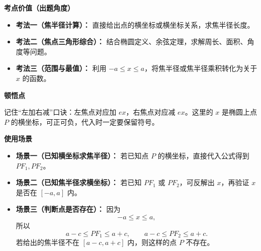 \begin{explanationbox}
	\medskip
	\textbf{\textcolor{CExplanation}{考点价值（出题角度）}}
	\begin{itemize}[leftmargin=*, itemsep=0.5em, topsep=0.4em]
		\item \textbf{考法一（焦半径计算）：} 直接给出点的横坐标或横坐标关系，求焦半径长度。
		\item \textbf{考法二（焦点三角形综合）：} 结合椭圆定义、余弦定理，求解周长、面积、角度等问题。
		\item \textbf{考法三（范围与最值）：} 利用 $-a\le x\le a$，将焦半径或焦半径乘积转化为关于 $x$ 的函数。
	\end{itemize}

	\medskip
	\textbf{\textcolor{CExplanation}{顿悟点}}

	记住“左加右减”口诀：左焦点对应加 $ex$，右焦点对应减 $ex$。这里的 $x$ 是椭圆上点 $P$ 的横坐标，可正可负，代入时一定要保留符号。

	\medskip
	\textbf{\textcolor{CExplanation}{使用场景}}
	\begin{itemize}[leftmargin=*, itemsep=0.5em, topsep=0.4em]
		\item \textbf{场景一（已知横坐标求焦半径）：} 若已知点 $P$ 的横坐标，直接代入公式得到 $PF_1,PF_2$。
		\item \textbf{场景二（已知焦半径求横坐标）：} 若已知 $PF_1$ 或 $PF_2$，可反解出 $x$，再验证 $x$ 是否在 $[-a,a]$ 内。
		\item \textbf{场景三（判断点是否存在）：} 因为
		      \[
			      -a\le x\le a,
		      \]
		      所以
		      \[
			      a-c\le PF_1\le a+c,\qquad a-c\le PF_2\le a+c.
		      \]
		      若给出的焦半径不在 $[a-c,a+c]$ 内，则这样的点 $P$ 不存在。
	\end{itemize}
\end{explanationbox}